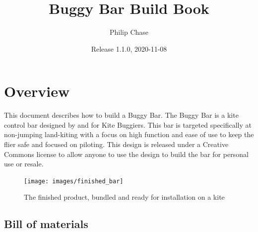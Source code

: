 \documentclass[
]{book}
\title{Buggy Bar Build Book}
\author{Philip Chase}
\date{Release 1.1.0, 2020-11-08}
\begin{document}
\maketitle

{
\setcounter{tocdepth}{1}
\tableofcontents
}
\hypertarget{overview}{%
\chapter{Overview}\label{overview}}

This document describes how to build a Buggy Bar. The Buggy Bar is a kite control bar designed by and for Kite Buggiers. This bar is targeted specifically at non-jumping land-kiting with a focus on high function and ease of use to keep the flier safe and focused on piloting. This design is released under a Creative Commons license to allow anyone to use the design to build the bar for personal use or resale.

\begin{figure}

{\centering \texttt{[image: images/finished\_bar]} 

}

\caption{The finished product, bundled and ready for installation on a kite}\label{fig:complete-bar}
\end{figure}

\hypertarget{bill-of-materials}{%
\section{Bill of materials}\label{bill-of-materials}}
\end{document}

